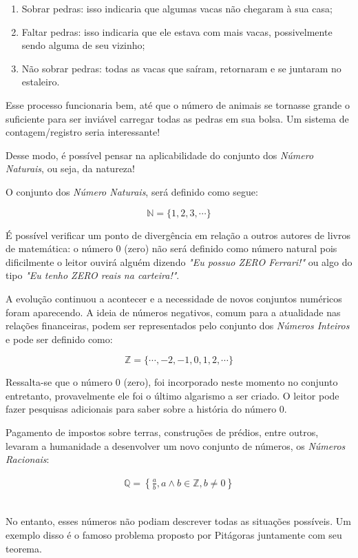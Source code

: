 \begin{enumerate}
	\item{Sobrar pedras: isso indicaria que algumas vacas não chegaram à sua casa;}
	\item{Faltar pedras: isso indicaria que ele estava com mais vacas, possivelmente sendo alguma de seu vizinho;}
	\item{Não sobrar pedras: todas as vacas que saíram, retornaram e se juntaram no estaleiro.}
\end{enumerate}

Esse processo funcionaria bem, até que o número de animais se tornasse grande o suficiente para ser inviável carregar todas as pedras em sua bolsa. Um sistema de contagem/registro seria interessante!

Desse modo, é possível pensar na aplicabilidade do conjunto dos \textit{Número Naturais}, ou seja, da natureza!

O conjunto dos \textit{Número Naturais}, será definido como segue:

$$
\mathbb{N}=\{1,2,3,\cdots\}
$$

É possível verificar um ponto de divergência em relação a outros autores de livros de matemática: o número 0 (zero) não será definido como número natural pois dificilmente o leitor ouvirá alguém dizendo \textit{"Eu possuo ZERO Ferrari!"} ou algo do tipo \textit{"Eu tenho ZERO reais na carteira!"}.

A evolução continuou a acontecer e a necessidade de novos conjuntos numéricos foram aparecendo. A ideia de números negativos, comum para a atualidade nas relações financeiras, podem ser representados pelo conjunto dos \textit{Números Inteiros} e pode ser definido como:

$$
\mathbb{Z}=\{\cdots ,-2, -1, 0, 1, 2, \cdots\}
$$

Ressalta-se que o número 0 (zero), foi incorporado neste momento no conjunto entretanto, provavelmente ele foi o último algarismo a ser criado. O leitor pode fazer pesquisas adicionais para saber sobre a história do número 0.

Pagamento de impostos sobre terras, construções de prédios, entre outros, levaram a humanidade a desenvolver um novo conjunto de números, os \textit{Números Racionais}:

\begin{ceqn}
\begin{align*}
\mathbb{Q}=\left \{\frac{a}{b} , a \wedge b \in \mathbb{Z}, b \neq 0\right \}
\end{align*}
\end{ceqn}
\\
\indent No entanto, esses números não podiam descrever todas as situações possíveis. Um exemplo disso é o famoso problema proposto por Pitágoras juntamente com seu teorema.
\\

